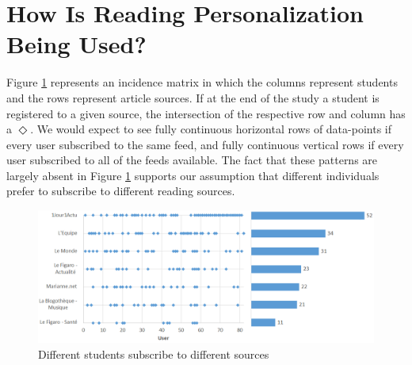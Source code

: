 
\section{How Is Reading Personalization Being Used?}
\label{sec:results}


Figure \ref{fig:subscriptions} represents an incidence matrix in which the columns represent students and the rows represent article sources. If at the end of the study a student is registered to a given source, the intersection of the respective row and column has a $\Diamond$. 
% 
We would expect to see fully continuous horizontal rows of data-points if every user subscribed to the same feed, and fully continuous vertical rows if every user subscribed to all of the feeds available. The fact that these patterns are largely absent in Figure \ref{fig:subscriptions} supports our assumption that different individuals prefer to subscribe to different reading sources.


\begin{figure}[h!]

\centering
  \includegraphics[width=0.9\columnwidth]{figures/subscription_plot}
  \caption{Different students subscribe to different sources}
  \label{fig:subscriptions}  
\end{figure}

